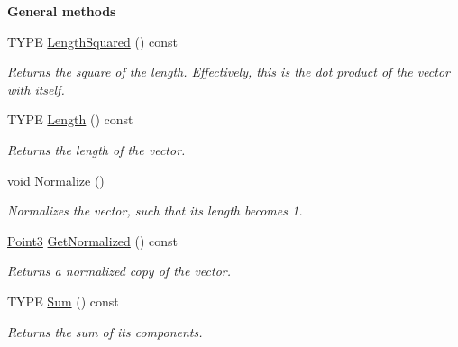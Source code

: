 \begin{Indent}\textbf{ General methods}\par
\begin{DoxyCompactItemize}
\item 
\mbox{\label{classcy_1_1_point3_a3c0235817a64d1b5c89d23d2268a3052}} 
T\+Y\+PE \mbox{\hyperlink{classcy_1_1_point3_a3c0235817a64d1b5c89d23d2268a3052}{Length\+Squared}} () const
\begin{DoxyCompactList}\small\item\em Returns the square of the length. Effectively, this is the dot product of the vector with itself. \end{DoxyCompactList}\item 
\mbox{\label{classcy_1_1_point3_ad3a6c6581567b1011bbce8bcabc40eaf}} 
T\+Y\+PE \mbox{\hyperlink{classcy_1_1_point3_ad3a6c6581567b1011bbce8bcabc40eaf}{Length}} () const
\begin{DoxyCompactList}\small\item\em Returns the length of the vector. \end{DoxyCompactList}\item 
\mbox{\label{classcy_1_1_point3_aa232a809cf81ea7e6a35cdc8035242f7}} 
void \mbox{\hyperlink{classcy_1_1_point3_aa232a809cf81ea7e6a35cdc8035242f7}{Normalize}} ()
\begin{DoxyCompactList}\small\item\em Normalizes the vector, such that its length becomes 1. \end{DoxyCompactList}\item 
\mbox{\label{classcy_1_1_point3_ae925ffd3c67b85a005f757d9e18ac906}} 
\mbox{\hyperlink{classcy_1_1_point3}{Point3}} \mbox{\hyperlink{classcy_1_1_point3_ae925ffd3c67b85a005f757d9e18ac906}{Get\+Normalized}} () const
\begin{DoxyCompactList}\small\item\em Returns a normalized copy of the vector. \end{DoxyCompactList}\item 
\mbox{\label{classcy_1_1_point3_acf5b3335735e26df456f80b53ccafe16}} 
T\+Y\+PE \mbox{\hyperlink{classcy_1_1_point3_acf5b3335735e26df456f80b53ccafe16}{Sum}} () const
\begin{DoxyCompactList}\small\item\em Returns the sum of its components. \end{DoxyCompactList}\item 

\end{DoxyCompactItemize}
\end{Indent}
